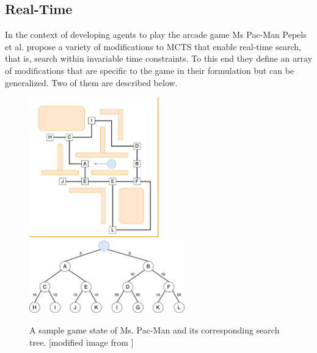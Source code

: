 \subsection{Real-Time}
\label{ss:real_time}
In the context of developing agents to play the arcade game Ms Pac-Man Pepels et al. \cite{pepels2014real} propose a variety of modifications to MCTS that enable real-time search, that is, search within invariable time constraints. To this end they define an array of modifications that are specific to the game in their formulation but can be generalized. Two of them are described below.
\begin{figure}[ht]
    \centering
    \includegraphics[width=0.5\textwidth]{img/mspacman.png}\\
    \vspace*{0.7cm}
    \includegraphics[width=0.6\textwidth]{img/mspacman-tree.png}
    \caption{A sample game state of Ms. Pac-Man and its corresponding search tree. [modified image from \cite{pepels2014real}]}
    \label{fig:mspacman}
\end{figure}
